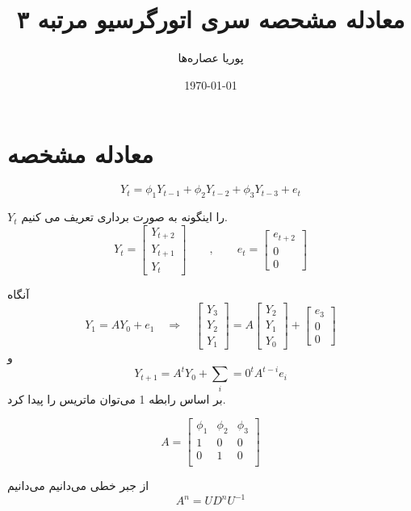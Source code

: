 \documentclass{article}
\title{معادله مشحصه سری اتورگرسیو مرتبه ۳}
\author{پوریا عصاره‌ها}
\date{\today}
\begin{document}
\maketitle

\section{ معادله مشخصه}

\begin{equation}
    Y_t = \phi_1 Y_{t-1} + \phi_2 Y_{t-2} + \phi_3 Y_{t-3} + e_t 
\end{equation} 

$Y_t$ را اینگونه به صورت برداری تعریف می کنیم.
\[
    Y_t = \left[ \begin{matrix}
        Y_{t+2} \\ Y_{t+1} \\ Y_{t}
    \end{matrix}  \right] \qquad , \qquad 
    e_t = \left[ \begin{matrix}
        e_{t+2} \\ 0 \\ 0 
    \end{matrix} \right] 
\]

آنگاه
\[ Y_1 = A Y_0 + e_1 \quad \Rightarrow \quad \left[ \begin{matrix}
    Y_{3} \\ Y_{2} \\ Y_{1}
\end{matrix} \right]  = A \left[ \begin{matrix}
    Y_{2} \\ Y_{1} \\ Y_{0}
\end{matrix} \right] + \left[ \begin{matrix}
    e_{3} \\ 0 \\ 0 
\end{matrix} \right]\]
و
\[ 
    Y_{t+1} = A^t Y_0 + \sum_i=0^t A^{t-i} e_i  
\]
بر اساس رابطه 1 می‌توان ماتریس  را پیدا کرد.

\[ A = \left[ \begin{matrix}
    \phi_1 & \phi_2 & \phi_3 \\
    1      &    0   &   0    \\
    0      &    1   &   0    \\
\end{matrix} \right] \]

از جبر خطی می‌دانیم می‌دانیم 
\[ 
    A^n = U D^n U^{-1}        
\]
\end{document}
